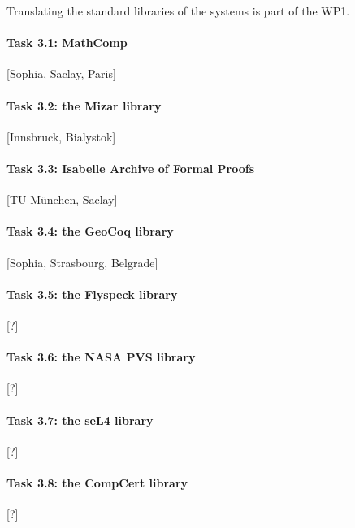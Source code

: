Translating the standard libraries of the systems is part of the WP1. 

\paragraph{Task 3.1: MathComp}

 [Sophia, Saclay, Paris]

\paragraph{Task 3.2: the Mizar library}

[Innsbruck, Bialystok]

\paragraph{Task 3.3: Isabelle Archive of Formal Proofs}

[TU München, Saclay]

\paragraph{Task 3.4: the GeoCoq library}

[Sophia, Strasbourg, Belgrade]

\paragraph{Task 3.5: the Flyspeck library} 

[?]

\paragraph{Task 3.6: the NASA PVS library} 

[?]

\paragraph{Task 3.7: the seL4 library}

[?]

\paragraph{Task 3.8: the CompCert library}

[?]
